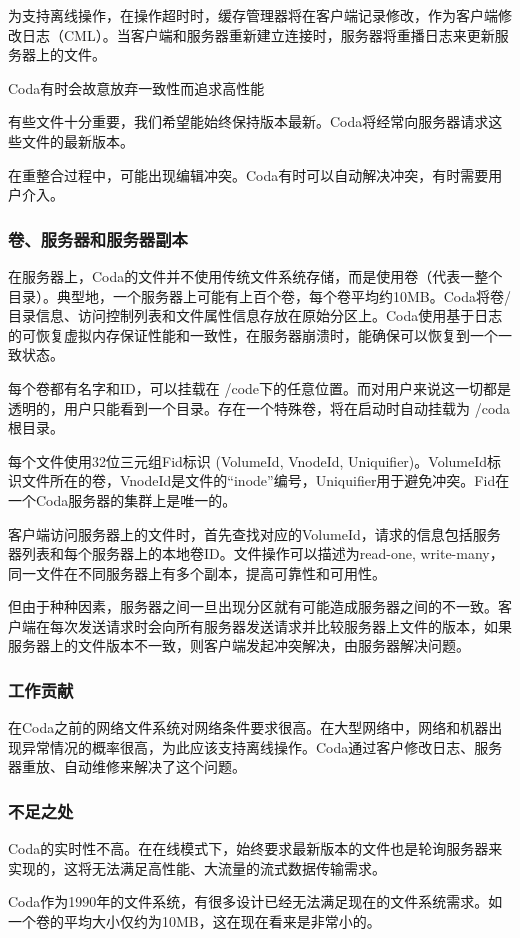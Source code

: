 \documentclass{ctexart}
\begin{document}
为支持离线操作，在操作超时时，缓存管理器将在客户端记录修改，作为客户端修改日志（CML）。当客户端和服务器重新建立连接时，服务器将重播日志来更新服务器上的文件。

Coda有时会故意放弃一致性而追求高性能

有些文件十分重要，我们希望能始终保持版本最新。Coda将经常向服务器请求这些文件的最新版本。

在重整合过程中，可能出现编辑冲突。Coda有时可以自动解决冲突，有时需要用户介入。
\subsubsection{卷、服务器和服务器副本}
在服务器上，Coda的文件并不使用传统文件系统存储，而是使用卷（代表一整个目录）。典型地，一个服务器上可能有上百个卷，每个卷平均约10MB。Coda将卷/目录信息、访问控制列表和文件属性信息存放在原始分区上。Coda使用基于日志的可恢复虚拟内存保证性能和一致性，在服务器崩溃时，能确保可以恢复到一个一致状态。

每个卷都有名字和ID，可以挂载在 /code下的任意位置。而对用户来说这一切都是透明的，用户只能看到一个目录。存在一个特殊卷，将在启动时自动挂载为 /coda根目录。

每个文件使用32位三元组Fid标识 (VolumeId, VnodeId, Uniquifier)。VolumeId标识文件所在的卷，VnodeId是文件的“inode”编号，Uniquifier用于避免冲突。Fid在一个Coda服务器的集群上是唯一的。

客户端访问服务器上的文件时，首先查找对应的VolumeId，请求的信息包括服务器列表和每个服务器上的本地卷ID。文件操作可以描述为read-one, write-many，同一文件在不同服务器上有多个副本，提高可靠性和可用性。

但由于种种因素，服务器之间一旦出现分区就有可能造成服务器之间的不一致。客户端在每次发送请求时会向所有服务器发送请求并比较服务器上文件的版本，如果服务器上的文件版本不一致，则客户端发起冲突解决，由服务器解决问题。
\subsubsection{工作贡献}
在Coda之前的网络文件系统对网络条件要求很高。在大型网络中，网络和机器出现异常情况的概率很高，为此应该支持离线操作。Coda通过客户修改日志、服务器重放、自动维修来解决了这个问题。
\subsubsection{不足之处}
Coda的实时性不高。在在线模式下，始终要求最新版本的文件也是轮询服务器来实现的，这将无法满足高性能、大流量的流式数据传输需求。

Coda作为1990年的文件系统，有很多设计已经无法满足现在的文件系统需求。如一个卷的平均大小仅约为10MB，这在现在看来是非常小的。
\end{document}

